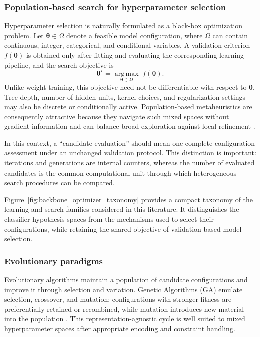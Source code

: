 \subsubsection{Population-based search for hyperparameter selection}

Hyperparameter selection is naturally formulated as a black-box optimization problem. Let $\boldsymbol{\theta} \in \Omega$ denote a feasible model configuration, where $\Omega$ can contain continuous, integer, categorical, and conditional variables. A validation criterion $f(\boldsymbol{\theta})$ is obtained only after fitting and evaluating the corresponding learning pipeline, and the search objective is
\begin{equation}\label{eq:metaheuristic_objective}
\boldsymbol{\theta}^{\star} = \underset{\boldsymbol{\theta} \in \Omega}{\operatorname{arg\,max}}\; f(\boldsymbol{\theta}).
\end{equation}
Unlike weight training, this objective need not be differentiable with respect to $\boldsymbol{\theta}$. Tree depth, number of hidden units, kernel choices, and regularization settings may also be discrete or conditionally active. Population-based metaheuristics are consequently attractive because they navigate such mixed spaces without gradient information and can balance broad exploration against local refinement \cite{jovanovic2024wann, faris2018gwo_review, rajwar2023exhaustive_review}.

In this context, a “candidate evaluation” should mean one complete configuration assessment under an unchanged validation protocol. This distinction is important: iterations and generations are internal counters, whereas the number of evaluated candidates is the common computational unit through which heterogeneous search procedures can be compared.

Figure~\ref{fig:backbone_optimizer_taxonomy} provides a compact taxonomy of the learning and search families considered in this literature. It distinguishes the classifier hypothesis spaces from the mechanisms used to select their configurations, while retaining the shared objective of validation-based model selection.

\subsubsection{Evolutionary paradigms}

Evolutionary algorithms maintain a population of candidate configurations and improve it through selection and variation. Genetic Algorithms (GA) emulate selection, crossover, and mutation: configurations with stronger fitness are preferentially retained or recombined, while mutation introduces new material into the population \cite{goldberg1989ga, jovanovic2024wann}. This representation-agnostic cycle is well suited to mixed hyperparameter spaces after appropriate encoding and constraint handling.

